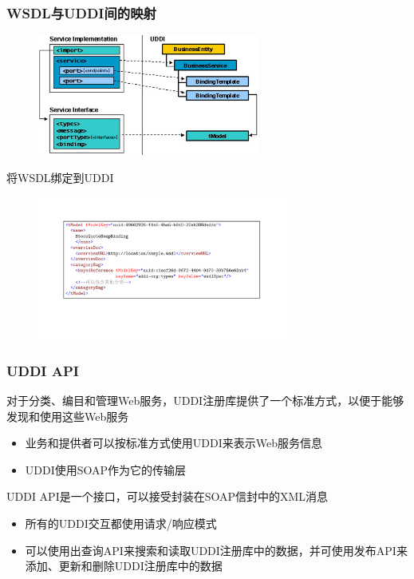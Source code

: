 \subsubsection{WSDL与UDDI间的映射}
\begin{figure}[H]
    \vspace{-0.5em}
	\centering
	\includegraphics[width=0.65\textwidth]{images/Mapping from WSDL to UDDI.png}
    \vspace{-1em}
\end{figure}

将WSDL绑定到UDDI
\begin{figure}[H]
    \vspace{-0.5em}
	\centering
	\includegraphics[width=0.75\textwidth]{images/将WSDL绑定到UDDI.pdf}
    \vspace{-1em}
\end{figure}

\subsubsection{UDDI API}
对于分类、编目和管理Web服务，UDDI注册库提供了一个标准方式，以便于能够发现和使用这些Web服务
\begin{itemize}
    \item 业务和提供者可以按标准方式使用UDDI来表示Web服务信息
    \item UDDI使用SOAP作为它的传输层
\end{itemize}

UDDI API是一个接口，可以接受封装在SOAP信封中的XML消息
\begin{itemize}
    \item 所有的UDDI交互都使用请求/响应模式
    \item 可以使用出查询API来搜索和读取UDDI注册库中的数据，并可使用发布API来添加、更新和删除UDDI注册库中的数据
\end{itemize}

